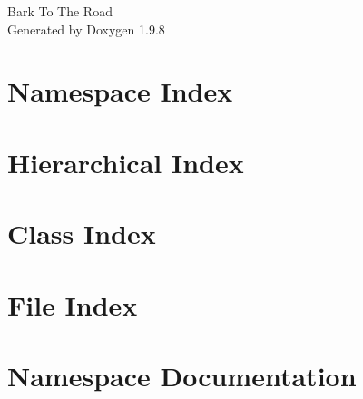 \documentclass[twoside]{book}
\newcommand{\+}{\discretionary{\mbox{\scriptsize$\hookleftarrow$}}{}{}}
\newcommand{\clearemptydoublepage}{%
    \newpage{\pagestyle{empty}\cleardoublepage}%
  }
\begin{document}
  \raggedbottom
    \hypersetup{pageanchor=false,
                bookmarksnumbered=true,
                pdfencoding=unicode
               }
  \begin{titlepage}
  \vspace*{7cm}
  \begin{center}%
  {\Large Bark To The Road}\\
  \vspace*{1cm}
  {\large Generated by Doxygen 1.9.8}\\
  \end{center}
  \end{titlepage}
  \clearemptydoublepage
  \tableofcontents
  \clearemptydoublepage
  \hypersetup{pageanchor=true}
\chapter{Namespace Index}

\chapter{Hierarchical Index}

\chapter{Class Index}

\chapter{File Index}

\chapter{Namespace Documentation}

\end{document}
